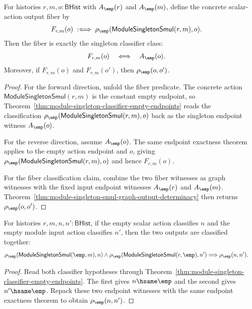 \begin{theorem}
\label{thm:module-singleton-smul-fiber-exhaustion}
For histories $r,m,o:\mathsf{BHist}$ with $A_{\emp}(r)$ and
$A_{\emp}(m)$, define the concrete scalar-action output fiber by
$$
F_{r,m}(o)\;:\Longleftrightarrow\;
\rho_{\emp}(\mathsf{ModuleSingletonSmul}(r,m),o).
$$
Then the fiber is exactly the singleton classifier class:
$$
F_{r,m}(o)\quad\Longleftrightarrow\quad A_{\emp}(o).
$$
Moreover, if $F_{r,m}(o)$ and $F_{r,m}(o')$, then
$\rho_{\emp}(o,o')$.
\end{theorem}
\begin{proof}
For the forward direction, unfold the fiber predicate. The concrete action
$\mathsf{ModuleSingletonSmul}(r,m)$ is the constant empty endpoint, so
Theorem~\ref{thm:module-singleton-classifier-empty-endpoints} reads the
classification
$\rho_{\emp}(\mathsf{ModuleSingletonSmul}(r,m),o)$ back as the singleton
endpoint witness $A_{\emp}(o)$.

For the reverse direction, assume $A_{\emp}(o)$. The same endpoint
exactness theorem applies to the empty action endpoint and $o$, giving
$\rho_{\emp}(\mathsf{ModuleSingletonSmul}(r,m),o)$ and hence
$F_{r,m}(o)$.

For the fiber classification claim, combine the two fiber witnesses as
graph witnesses with the fixed input endpoint witnesses $A_{\emp}(r)$ and
$A_{\emp}(m)$. Theorem~\ref{thm:module-singleton-smul-graph-output-determinacy}
then returns $\rho_{\emp}(o,o')$.
\end{proof}

\begin{theorem}
\label{thm:module-singleton-smul-empty-action-outputs-deterministic}
For histories $r,m,n,n':\mathsf{BHist}$, if the empty scalar action classifies
$n$ and the empty module input action classifies $n'$, then the two outputs are
classified together:
$$
\rho_{\emp}(\mathsf{ModuleSingletonSmul}(\emp,m),n)
\wedge
\rho_{\emp}(\mathsf{ModuleSingletonSmul}(r,\emp),n')
\Longrightarrow
\rho_{\emp}(n,n').
$$
\end{theorem}
\begin{proof}
Read both classifier hypotheses through
Theorem~\ref{thm:module-singleton-classifier-empty-endpoints}. The first gives
$n\hsame\emp$ and the second gives $n'\hsame\emp$. Repack these two endpoint
witnesses with the same endpoint exactness theorem to obtain
$\rho_{\emp}(n,n')$.
\end{proof}


